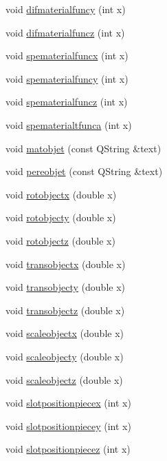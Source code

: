 \begin{DoxyCompactItemize}
void \hyperlink{class_mondock_acb6ef6ce35644055c6782614193c0abf}{difmaterialfuncy} (int x)
\item 
void \hyperlink{class_mondock_a8ff74685d0e326198673395786ca80d4}{difmaterialfuncz} (int x)
\item 
void \hyperlink{class_mondock_ad62497d70cea045864c6f6dfa63f0a4c}{spematerialfuncx} (int x)
\item 
void \hyperlink{class_mondock_ada51acb02b3cb5d32e3982e93e2b2951}{spematerialfuncy} (int x)
\item 
void \hyperlink{class_mondock_aebe3927b8d0b1c6a703580cf69284405}{spematerialfuncz} (int x)
\item 
void \hyperlink{class_mondock_acfe377696276e313ee29188412cdefc5}{spematerialtfunca} (int x)
\item 
void \hyperlink{class_mondock_ae7cba6de97474c812bf5f6e1f5372540}{matobjet} (const Q\+String \&text)
\item 
void \hyperlink{class_mondock_afcb87fab11d89a1a24da091153d4dbac}{pereobjet} (const Q\+String \&text)
\item 
void \hyperlink{class_mondock_a7543dea413bcfc6c79847373e99f75fc}{rotobjectx} (double x)
\item 
void \hyperlink{class_mondock_ad182d69edf7f245ade47b574813357d0}{rotobjecty} (double x)
\item 
void \hyperlink{class_mondock_a90dd35e5da95e3b29a44104f8527605b}{rotobjectz} (double x)
\item 
void \hyperlink{class_mondock_a68ab5d84182366c7231014333055d12d}{transobjectx} (double x)
\item 
void \hyperlink{class_mondock_ac6fba22518497d0b8ed04c976dd98ef3}{transobjecty} (double x)
\item 
void \hyperlink{class_mondock_a4577b03f35f3e2eaa7d1826b1a9f0ebe}{transobjectz} (double x)
\item 
void \hyperlink{class_mondock_a6978ac0641ff991c971ddbb571a8e8fd}{scaleobjectx} (double x)
\item 
void \hyperlink{class_mondock_a5d96ddec02aefd94fe519bcb9d973e4f}{scaleobjecty} (double x)
\item 
void \hyperlink{class_mondock_a1f5430731565a79314d90de605741e75}{scaleobjectz} (double x)
\item 
void \hyperlink{class_mondock_aab1b5fe42325904c90cb7ea01d20dda3}{slotpositionpiecex} (int x)
\item 
void \hyperlink{class_mondock_aa9b2f07da91515f13c0dc217d24357ba}{slotpositionpiecey} (int x)
\item 
void \hyperlink{class_mondock_a655881c708869d768f1488d6fa066dc6}{slotpositionpiecez} (int x)
\end{DoxyCompactItemize}
